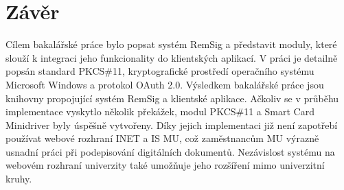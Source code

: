 \documentclass[]{fithesis3}
\begin{document}
\let\cleardoublepage\clearpage

\chapter{Závěr}

Cílem bakalářské práce bylo popsat systém RemSig a představit moduly, které slouží k integraci jeho funkcionality do klientských aplikací. V práci je detailně popsán standard PKCS\#11, kryptografické prostředí operačního systému Microsoft Windows a protokol OAuth 2.0. Výsledkem bakalářské práce jsou knihovny propojující systém RemSig a klientské aplikace. Ačkoliv se v průběhu implementace vyskytlo několik překážek, modul PKCS\#11 a Smart Card Minidriver byly úspěšně vytvořeny. Díky jejich implementaci již není zapotřebí používat webové rozhraní INET a IS MU, což zaměstnancům MU výrazně usnadní práci při podepisování digitálních dokumentů. Nezávislost systému na webovém rozhraní univerzity také umožňuje jeho rozšíření mimo univerzitní kruhy.
\end{document}

